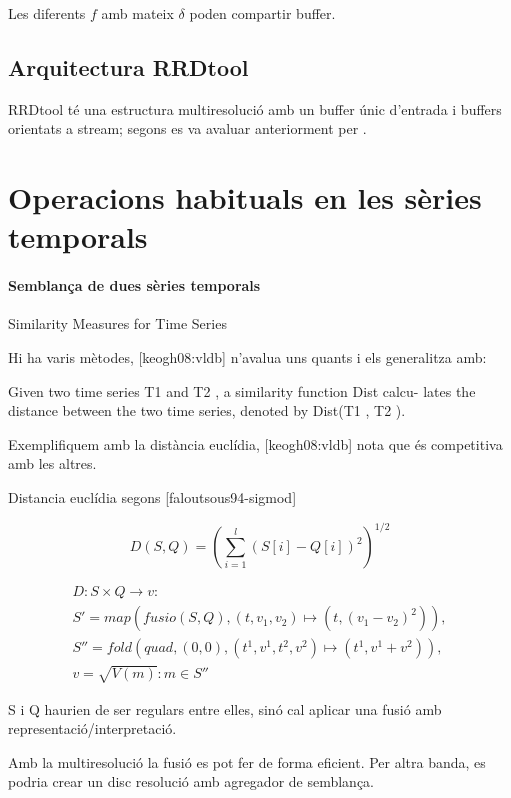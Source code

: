 Les diferents $f$ amb mateix $\delta$ poden compartir buffer.





\subsection{Arquitectura RRDtool}


RRDtool té una estructura multiresolució amb un buffer únic d'entrada
i buffers orientats a stream; segons es va avaluar anteriorment per
\textcite{llusa11:tfm}.






\section{Operacions habituals en les sèries temporals}


\paragraph{Semblança de dues sèries temporals}


Similarity Measures for Time Series

Hi ha varis mètodes, [keogh08:vldb] n'avalua uns quants i els generalitza amb:

Given two
time series T1 and T2 , a similarity function Dist calcu-
lates the distance between the two time series, denoted by
Dist(T1 , T2 ).

Exemplifiquem amb la distància euclídia, [keogh08:vldb] nota que és
competitiva amb les altres.

Distancia euclídia segons [faloutsous94-sigmod]


\[
D(S,Q) = \left( \sum_{i=1}^{l} (S[i]-Q[i])^2  \right)^{1/2}
\]

\begin{gather*}
  D: S \times Q \longrightarrow v: \\
  S' = map(fusio(S,Q),(t,v_1,v_2)\mapsto(t,(v_1-v_2)^2)), \\
  S'' = fold(quad,(0,0),(t^1,v^1,t^2,v^2)\mapsto(t^1,v^1+v^2)), \\
  v = \sqrt{V(m)}:m\in S''
\end{gather*}


S i Q haurien de ser regulars entre elles, sinó cal aplicar una fusió amb representació/interpretació.

Amb la multiresolució la fusió es pot fer de forma eficient. Per altra banda, es podria crear un disc resolució amb agregador de semblança.


